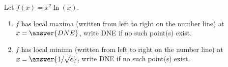 \documentclass{ximera}
\author{Gregory Hartman \and Matthew Carr}
\begin{document}
\begin{exercise}






Let $f(x)=x^{2}\ln(x)$.
\begin{enumerate}
\item		$f$ has local maxima (written from left to right on the number line) at $x=\answer{DNE}$, write DNE if no such point(s) exist.
\item		$f$ has local minima (written from left to right on the number line) at $x=\answer{1/\sqrt{e}}$, write DNE if no such point(s) exist.
\end{enumerate}

\end{exercise}
\end{document}
